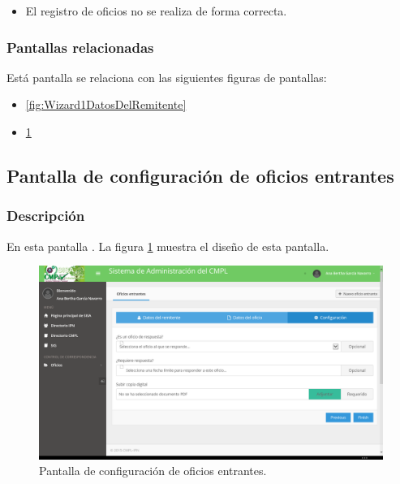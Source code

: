 	\begin{itemize}
		\item El registro de oficios no se realiza de forma correcta.
	\end{itemize}

\subsubsection{Pantallas relacionadas}
Está pantalla se relaciona con las siguientes figuras de pantallas:
	\begin{itemize}
		\item \ref{fig:Wizard1DatosDelRemitente}
		\item \ref{fig:Wizard3Configuracion}
	\end{itemize}

\subsection{Pantalla de configuración de oficios entrantes}
\subsubsection{Descripción}
	En esta pantalla . La figura \ref{fig:Wizard3Configuracion} muestra el diseño de esta pantalla.		
		
	\begin{figure}[htbp!]
		\centering
			\includegraphics[width=1\textwidth]{Pantallas/Wizard3Configuracion.png}
		\caption{Pantalla de configuración de oficios entrantes.}
		\label{fig:Wizard3Configuracion}
	\end{figure}

